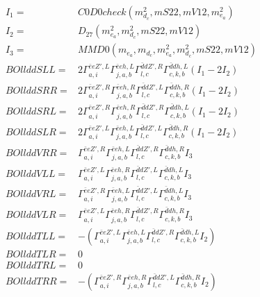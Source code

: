\documentclass[A4,landscape]{article}
\begin{document}
\begin{align} 
I_1 = & C0D0check(m^2_{d_{{c}}}, mS22, mV12, m^2_{e_{{a}}}) \\ 
I_2 = & D_{27}(m^2_{e_{{a}}}, m^2_{d_{{c}}}, mS22, mV12) \\ 
I_3 = & MMD0(m_{e_{{a}}}, m_{d_{{c}}}, m^2_{e_{{a}}}, m^2_{d_{{c}}}, mS22, mV12) \\ 
  BOllddSLL= & 2  \Gamma^{\bar{e}e {Z'} ,L}_{a, i} \Gamma^{\bar{e}e h ,L}_{j, a, b} \Gamma^{\bar{d}d {Z'} ,R}_{l, c} \Gamma^{\bar{d}d h ,L}_{c, k, b} (I_1 - 2 I_2) \\ 
  BOllddSRR= & 2  \Gamma^{\bar{e}e {Z'} ,R}_{a, i} \Gamma^{\bar{e}e h ,R}_{j, a, b} \Gamma^{\bar{d}d {Z'} ,L}_{l, c} \Gamma^{\bar{d}d h ,R}_{c, k, b} (I_1 - 2 I_2) \\ 
  BOllddSRL= & 2  \Gamma^{\bar{e}e {Z'} ,R}_{a, i} \Gamma^{\bar{e}e h ,R}_{j, a, b} \Gamma^{\bar{d}d {Z'} ,R}_{l, c} \Gamma^{\bar{d}d h ,L}_{c, k, b} (I_1 - 2 I_2) \\ 
  BOllddSLR= & 2  \Gamma^{\bar{e}e {Z'} ,L}_{a, i} \Gamma^{\bar{e}e h ,L}_{j, a, b} \Gamma^{\bar{d}d {Z'} ,L}_{l, c} \Gamma^{\bar{d}d h ,R}_{c, k, b} (I_1 - 2 I_2) \\ 
  BOllddVRR= &  \Gamma^{\bar{e}e {Z'} ,R}_{a, i} \Gamma^{\bar{e}e h ,L}_{j, a, b} \Gamma^{\bar{d}d {Z'} ,R}_{l, c} \Gamma^{\bar{d}d h ,R}_{c, k, b} I_3 \\ 
  BOllddVLL= &  \Gamma^{\bar{e}e {Z'} ,L}_{a, i} \Gamma^{\bar{e}e h ,R}_{j, a, b} \Gamma^{\bar{d}d {Z'} ,L}_{l, c} \Gamma^{\bar{d}d h ,L}_{c, k, b} I_3 \\ 
  BOllddVRL= &  \Gamma^{\bar{e}e {Z'} ,R}_{a, i} \Gamma^{\bar{e}e h ,L}_{j, a, b} \Gamma^{\bar{d}d {Z'} ,L}_{l, c} \Gamma^{\bar{d}d h ,L}_{c, k, b} I_3 \\ 
  BOllddVLR= &  \Gamma^{\bar{e}e {Z'} ,L}_{a, i} \Gamma^{\bar{e}e h ,R}_{j, a, b} \Gamma^{\bar{d}d {Z'} ,R}_{l, c} \Gamma^{\bar{d}d h ,R}_{c, k, b} I_3 \\ 
  BOllddTLL= & -( \Gamma^{\bar{e}e {Z'} ,L}_{a, i} \Gamma^{\bar{e}e h ,L}_{j, a, b} \Gamma^{\bar{d}d {Z'} ,R}_{l, c} \Gamma^{\bar{d}d h ,L}_{c, k, b} I_2) \\ 
  BOllddTLR= & 0 \\ 
  BOllddTRL= & 0 \\ 
  BOllddTRR= & -( \Gamma^{\bar{e}e {Z'} ,R}_{a, i} \Gamma^{\bar{e}e h ,R}_{j, a, b} \Gamma^{\bar{d}d {Z'} ,L}_{l, c} \Gamma^{\bar{d}d h ,R}_{c, k, b} I_2) \\ 
\end{align} 
\end{document}
